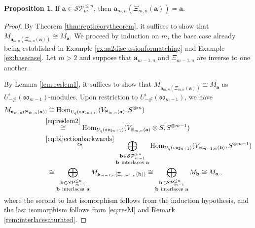 \documentclass[10pt]{amsart}
\numberwithin{equation}{section}
\theoremstyle{definition}
\newtheorem{prop}[thm]{Proposition}
\newcommand{\Hom}{{\rm Hom}}
\newcommand{\son}[1][2n+1]{\mathfrak{so}_{#1}}
\newcommand{\som}[1][m]{\mathfrak{so}_{#1}}
\newcommand{\iqUsom}[1][m]{{U}^{\iota}_{-q^2}(\som[#1])}
\newcommand{\ab}{\mathbf{a}}
\newcommand{\abb}{\mathbf{b}}
\newcommand{\SP}{\mathcal{SP}}
\begin{document}
\begin{prop}\label{prop:Xiisinversetoa}
If $\ab\in \SP_{m}^{\le n}$, then $\ab_{m,n}(\Xi_{m,n}(\ab)) = \ab$. 
\end{prop}
\begin{proof}
By Theorem \ref{thm:reptheorytheorem}, it suffices to show that $M_{\ab_{m,n}(\Xi_{m,n}(\ab))}\cong M_{\ab}$. 
We proceed by induction on $m$, the base case already being established in Example \ref{ex:m2discussionformatching} and Example \ref{ex:basecase}. 
Let $m>2$ and suppose that $\ab_{m-1, n}$ and $\Xi_{m-1,n}$ are inverse to one another. 

By Lemma \ref{lem:reslem1}, it suffices to show that $M_{\ab_{m,n}(\Xi_{m,n}(\ab))}\cong M_{\ab}$ as $\iqUsom[m-1]$-modules. 
Upon restriction to $\iqUsom[m-1]$, we have
\begin{align*}
M_{\ab_{m,n}(\Xi_{m,n}(\ab))} &\cong \Hom_{U_q(\son)}(V_{\Xi_{m,n}(\ab)}, S^{\otimes m}) \\
&\!\!\!\stackrel{\eqref{eq:reslem2}}{\cong} \Hom_{U_q(\son)}(V_{\Xi_{m,n}(\ab)}\otimes S, S^{\otimes m-1}) \\
&\!\!\!\stackrel{\eqref{eq:bijectionbackwards}}{\cong} \bigoplus_{\substack{ \abb\in \SP_{m-1}^{\le n} \\\abb \ \text{interlaces} \ \ab}} \Hom_{U_q(\son)}(V_{\Xi_{m-1,n}(\abb)}, S^{\otimes m-1}) \\
&\cong \bigoplus_{\substack{ \abb\in \SP_{m-1}^{\le n} \\\abb \ \text{interlaces} \ \ab}} M_{\ab_{m-1, n}(\Xi_{m-1, n}(\abb))}
\cong \bigoplus_{\substack{ \abb\in \SP_{m-1}^{\le n} \\\abb \ \text{interlaces} \ \ab}} M_{\abb}
\cong M_{\ab} \, ,
\end{align*}
where the second to last isomorphism follows from the induction hypothesis, 
and the last isomorphism follows from \eqref{eq:resM} and Remark \ref{rem:interlacesaturated}.
\end{proof}


%
%
\end{document}
